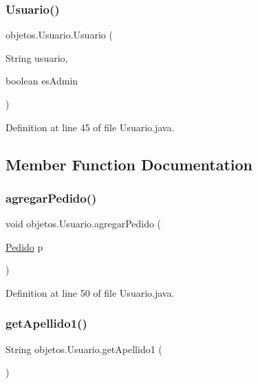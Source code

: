\subsubsection{\texorpdfstring{Usuario()}{Usuario()}\hspace{0.1cm}{\footnotesize\ttfamily [2/2]}}
{\footnotesize\ttfamily objetos.\+Usuario.\+Usuario (\begin{DoxyParamCaption}\item[{String}]{usuario,  }\item[{boolean}]{es\+Admin }\end{DoxyParamCaption})}



Definition at line 45 of file Usuario.\+java.



\subsection{Member Function Documentation}
\mbox{\label{classobjetos_1_1_usuario_a1d3a6e897c852226d1b419c67089ec3b}} 
\subsubsection{\texorpdfstring{agregar\+Pedido()}{agregarPedido()}}
{\footnotesize\ttfamily void objetos.\+Usuario.\+agregar\+Pedido (\begin{DoxyParamCaption}\item[{\mbox{\hyperlink{classobjetos_1_1_pedido}{Pedido}}}]{p }\end{DoxyParamCaption})}



Definition at line 50 of file Usuario.\+java.

\mbox{\label{classobjetos_1_1_usuario_ae9882e1900abade7ade510479c9f8383}} 
\subsubsection{\texorpdfstring{get\+Apellido1()}{getApellido1()}}
{\footnotesize\ttfamily String objetos.\+Usuario.\+get\+Apellido1 (\begin{DoxyParamCaption}{ }\end{DoxyParamCaption})}



